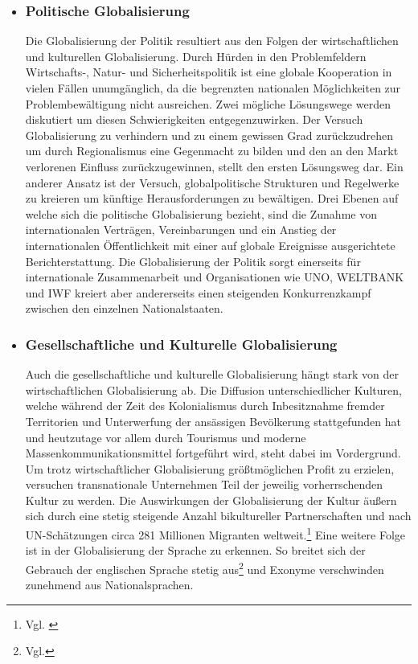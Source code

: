 \documentclass[12pt]{article}
\begin{document}
\begin{itemize}
    \item \subsubsection{Politische Globalisierung} \label{subsec:politGlob}
    \begin{sloppypar}
    Die Globalisierung der Politik resultiert aus den Folgen der wirtschaftlichen und kulturellen Globalisierung. Durch Hürden in den Problemfeldern Wirtschafts-, Natur- und Sicherheitspolitik ist eine globale Kooperation in vielen Fällen unumgänglich, da die begrenzten nationalen Möglichkeiten zur Problembewältigung nicht ausreichen. Zwei mögliche Lösungswege werden diskutiert um diesen Schwierigkeiten entgegenzuwirken. Der Versuch Globalisierung zu verhindern und zu einem gewissen Grad zurückzudrehen um durch Regionalismus eine Gegenmacht zu bilden und den an den Markt verlorenen Einfluss zurückzugewinnen, stellt den ersten Lösungsweg dar. Ein anderer Ansatz ist der Versuch, globalpolitische Strukturen und Regelwerke zu kreieren um künftige Herausforderungen zu bewältigen. Drei Ebenen auf welche sich die politische Globalisierung bezieht, sind die Zunahme von internationalen Verträgen, Vereinbarungen und ein Anstieg der internationalen Öffentlichkeit mit einer auf globale Ereignisse ausgerichtete Berichterstattung. Die Globalisierung der Politik sorgt einerseits für internationale Zusammenarbeit und Organisationen wie UNO, WELTBANK und IWF kreiert aber andererseits einen steigenden Konkurrenzkampf zwischen den einzelnen Nationalstaaten.
    \end{sloppypar}
    \item \subsubsection{Gesellschaftliche und Kulturelle Globalisierung} \label{sc:gesellKultGlob}
    \begin{sloppypar}
    Auch die gesellschaftliche und kulturelle Globalisierung hängt stark von der wirtschaftlichen Globalisierung ab. Die Diffusion unterschiedlicher Kulturen, welche während der Zeit des Kolonialismus durch Inbesitznahme fremder Territorien und Unterwerfung der ansässigen Bevölkerung stattgefunden hat und heutzutage vor allem durch Tourismus und moderne Massenkommunikationsmittel fortgeführt wird, steht dabei im Vordergrund. Um trotz wirtschaftlicher Globalisierung größtmöglichen Profit zu erzielen, versuchen transnationale Unternehmen Teil der jeweilig vorherrschenden Kultur zu werden. Die Auswirkungen der Globalisierung der Kultur äußern sich durch eine stetig steigende Anzahl bikultureller Partnerschaften und nach UN-Schätzungen circa 281 Millionen Migranten weltweit.\footnote{Vgl. \cite{WMR2020}} Eine weitere Folge ist in der Globalisierung der Sprache zu erkennen. So breitet sich der Gebrauch der englischen Sprache stetig aus\footnote{Vgl.\cite{Sprache2016}} und Exonyme verschwinden zunehmend aus Nationalsprachen.

\end{sloppypar}
\end{itemize}
\end{document}
